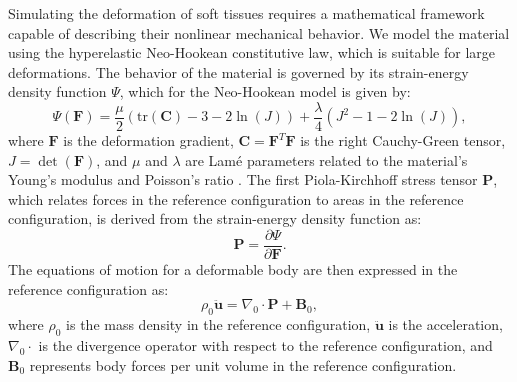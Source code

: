 \documentclass[11pt,a4paper,twocolumn]{article}
\begin{document}
Simulating the deformation of soft tissues requires a mathematical framework capable of describing their nonlinear mechanical behavior. We model the material using the hyperelastic Neo-Hookean constitutive law, which is suitable for large deformations. The behavior of the material is governed by its strain-energy density function $\Psi$, which for the Neo-Hookean model is given by:
\begin{equation}
    \Psi(\bm{F}) = \frac{\mu}{2} (\text{tr}(\bm{C}) - 3 - 2\ln(J)) + \frac{\lambda}{4} (J^2 - 1 - 2\ln(J)),
\label{eq:es:neo_hookean_energy}
\end{equation}
where $\bm{F}$ is the deformation gradient, $\bm{C} = \bm{F}^T \bm{F}$ is the right Cauchy-Green tensor, $J = \det(\bm{F})$, and $\mu$ and $\lambda$ are Lamé parameters related to the material's Young's modulus and Poisson's ratio \cite{Ogden_1997}. The first Piola-Kirchhoff stress tensor $\bm{P}$, which relates forces in the reference configuration to areas in the reference configuration, is derived from the strain-energy density function as:
\begin{equation}
    \bm{P} = \frac{\partial \Psi}{\partial \bm{F}}.
\label{eq:es:first_piola_kirchhoff}
\end{equation}
The equations of motion for a deformable body are then expressed in the reference configuration as:
\begin{equation}
    \rho_0 \ddot{\bm{u}} = \nabla_0 \cdot \bm{P} + \bm{B}_0,
\label{eq:es:equations_of_motion}
\end{equation}
where $\rho_0$ is the mass density in the reference configuration, $\ddot{\bm{u}}$ is the acceleration, $\nabla_0 \cdot$ is the divergence operator with respect to the reference configuration, and $\bm{B}_0$ represents body forces per unit volume in the reference configuration.
\end{document}
